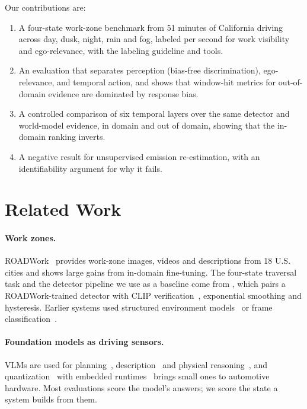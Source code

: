 \documentclass[conference]{IEEEtran}
\begin{document}
Our contributions are:
\begin{enumerate}
\item A four-state work-zone benchmark from 51 minutes of California driving across day, dusk, night, rain and fog, labeled per second for work visibility and ego-relevance, with the labeling guideline and tools.
\item An evaluation that separates perception (bias-free discrimination), ego-relevance, and temporal action, and shows that window-hit metrics for out-of-domain evidence are dominated by response bias.
\item A controlled comparison of six temporal layers over the same detector and world-model evidence, in domain and out of domain, showing that the in-domain ranking inverts.
\item A negative result for unsupervised emission re-estimation, with an identifiability argument for why it fails.
\end{enumerate}

\section{Related Work}
\label{sec:related}

\paragraph{Work zones.} ROADWork~\cite{ghosh2025roadwork} provides work-zone images, videos and descriptions from 18 U.S. cities and shows large gains from in-domain fine-tuning. The four-state traversal task and the detector pipeline we use as a baseline come from \cite{priorsystem2026}, which pairs a ROADWork-trained detector with CLIP verification~\cite{radford2021clip}, exponential smoothing and hysteresis. Earlier systems used structured environment models~\cite{shi2021workzone} or frame classification~\cite{abodo2018shrp}.

\paragraph{Foundation models as driving sensors.} VLMs are used for planning~\cite{hwang2024emma,tian2024drivevlm}, description~\cite{marcu2024lingoqa} and physical reasoning~\cite{nvidia2025cosmosreason,nvidia2026cosmos3,alpamayo2026}, and quantization~\cite{lin2024awq} with embedded runtimes~\cite{trtedgellm} brings small ones to automotive hardware. Most evaluations score the model's answers; we score the state a system builds from them.
\end{document}
